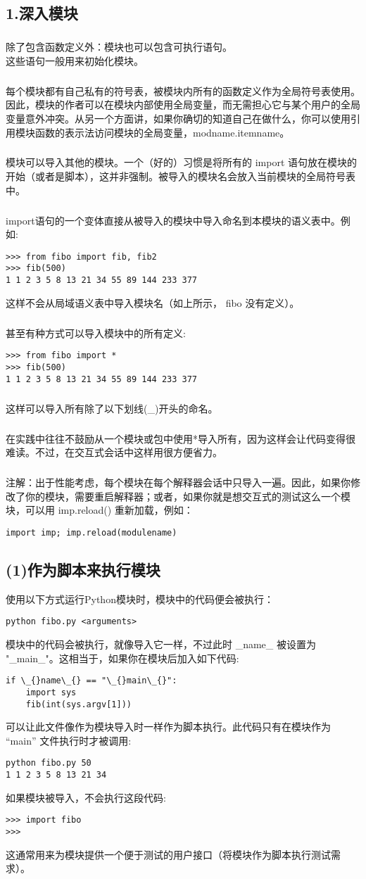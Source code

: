 \documentclass{article}
\begin{document}
\begin{CJK}{UTF8}{gbsn}
\section*{1.深入模块}
\subparagraph*{}
除了包含函数定义外：模块也可以包含可执行语句。\\
这些语句一般用来初始化模块。
\subparagraph*{}
每个模块都有自己私有的符号表，被模块内所有的函数定义作为全局符号表使用。因此，模块的作者可以在模块内部使用全局变量，而无需担心它与某个用户的全局变量意外冲突。从另一个方面讲，如果你确切的知道自己在做什么，你可以使用引用模块函数的表示法访问模块的全局变量，modname.itemname。
\subparagraph*{}
模块可以导入其他的模块。一个（好的）习惯是将所有的 import 语句放在模块的开始（或者是脚本），这并非强制。被导入的模块名会放入当前模块的全局符号表中。
\subparagraph*{}
import语句的一个变体直接从被导入的模块中导入命名到本模块的语义表中。例如:
\begin{verbatim}
>>> from fibo import fib, fib2
>>> fib(500)
1 1 2 3 5 8 13 21 34 55 89 144 233 377
\end{verbatim}
这样不会从局域语义表中导入模块名（如上所示， fibo 没有定义）。
\subparagraph*{}
甚至有种方式可以导入模块中的所有定义:
\begin{verbatim}
>>> from fibo import *
>>> fib(500)
1 1 2 3 5 8 13 21 34 55 89 144 233 377
\end{verbatim}
\subparagraph*{}
这样可以导入所有除了以下划线(\_{})开头的命名。
\subparagraph*{}
在实践中往往不鼓励从一个模块或包中使用*导入所有，因为这样会让代码变得很难读。不过，在交互式会话中这样用很方便省力。
\subparagraph*{}
注解：出于性能考虑，每个模块在每个解释器会话中只导入一遍。因此，如果你修改了你的模块，需要重启解释器；或者，如果你就是想交互式的测试这么一个模块，可以用 imp.reload() 重新加载，例如：
\begin{verbatim}
import imp; imp.reload(modulename)
\end{verbatim}
\subsection*{(1)作为脚本来执行模块}
使用以下方式运行Python模块时，模块中的代码便会被执行：
\begin{verbatim}
python fibo.py <arguments>
\end{verbatim}
模块中的代码会被执行，就像导入它一样，不过此时 \_{}name\_{} 被设置为 "\_{}main\_{}"。这相当于，如果你在模块后加入如下代码:
\begin{verbatim}
if \_{}name\_{} == "\_{}main\_{}":
    import sys
    fib(int(sys.argv[1]))
\end{verbatim}
可以让此文件像作为模块导入时一样作为脚本执行。此代码只有在模块作为 “main” 文件执行时才被调用:
\begin{verbatim}
python fibo.py 50
1 1 2 3 5 8 13 21 34 
\end{verbatim}
如果模块被导入，不会执行这段代码:
\begin{verbatim}
>>> import fibo
>>>
\end{verbatim}
这通常用来为模块提供一个便于测试的用户接口（将模块作为脚本执行测试需求）。

\end{CJK}
\end{document}
